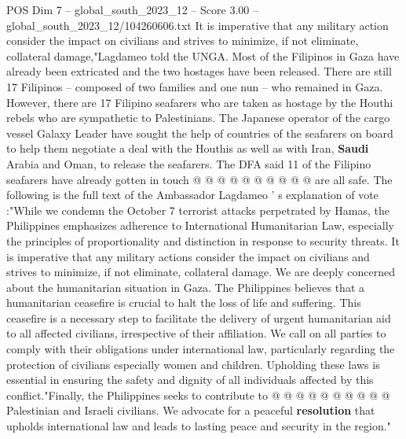 \begin{textsample}{POS Dim 7 – global\_south\_2023\_12 – Score 3.00 – global\_south\_2023\_12/104260606.txt}
It is imperative that any military action consider the impact on civilians and strives to minimize, if not eliminate, collateral damage,"Lagdameo told the UNGA.
Most of the Filipinos in Gaza have already been extricated and the two hostages have been released.
There are still 17 Filipinos -- composed of two families and one nun -- who remained in Gaza.
However, there are 17 Filipino seafarers who are taken as hostage by the Houthi rebels who are sympathetic to Palestinians.
The Japanese operator of the cargo vessel Galaxy Leader have sought the help of countries of the seafarers on board to help them negotiate a deal with the Houthis as well as with Iran, \textbf{Saudi} Arabia and Oman, to release the seafarers.
The DFA said 11 of the Filipino seafarers have already gotten in touch @ @ @ @ @ @ @ @ @ @ are all safe.
The following is the full text of the Ambassador Lagdameo ' s explanation of vote :"While we condemn the October 7 terrorist attacks perpetrated by Hamas, the Philippines emphasizes adherence to International Humanitarian Law, especially the principles of proportionality and distinction in response to security threats.
It is imperative that any military actions consider the impact on civilians and strives to minimize, if not eliminate, collateral damage.
We are deeply concerned about the humanitarian situation in Gaza.
The Philippines believes that a humanitarian ceasefire is crucial to halt the loss of life and suffering.
This ceasefire is a necessary step to facilitate the delivery of urgent humanitarian aid to all affected civilians, irrespective of their affiliation.
We call on all parties to comply with their obligations under international law, particularly regarding the protection of civilians especially women and children.
Upholding these laws is essential in ensuring the safety and dignity of all individuals affected by this conflict."Finally, the Philippines seeks to contribute to @ @ @ @ @ @ @ @ @ @ Palestinian and Israeli civilians.
We advocate for a peaceful \textbf{resolution} that upholds international law and leads to lasting peace and security in the region."

\end{textsample}
